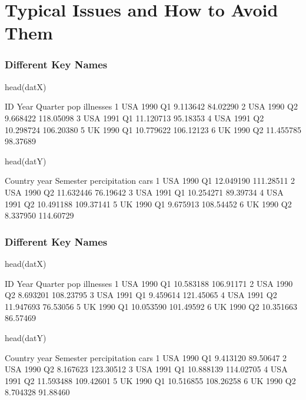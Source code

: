 \documentclass[10pt,american]{beamer}
\renewenvironment{Schunk}{}{}
\renewenvironment{Sinput}{}{}
\begin{document}
\section{Typical Issues and How to Avoid Them}
\begin{frame}
\frametitle{Different Key Names}
\begin{Schunk}
\begin{Sinput}
 head(datX)
\end{Sinput}
\begin{Soutput}
   ID Year Quarter       pop illnesses
1 USA 1990      Q1  9.113642  84.02290
2 USA 1990      Q2  9.668422 118.05098
3 USA 1991      Q1 11.120713  95.18353
4 USA 1991      Q2 10.298724 106.20380
5  UK 1990      Q1 10.779622 106.12123
6  UK 1990      Q2 11.455785  98.37689
\end{Soutput}
\begin{Sinput}
 head(datY)
\end{Sinput}
\begin{Soutput}
  Country year Semester percipitation      cars
1     USA 1990       Q1     12.049190 111.28511
2     USA 1990       Q2     11.632446  76.19642
3     USA 1991       Q1     10.254271  89.39734
4     USA 1991       Q2     10.491188 109.37141
5      UK 1990       Q1      9.675913 108.54452
6      UK 1990       Q2      8.337950 114.60729
\end{Soutput}
\end{Schunk}
\end{frame}








\begin{frame}
\frametitle{Different Key Names}
\begin{Schunk}
\begin{Sinput}
 head(datX)
\end{Sinput}
\begin{Soutput}
   ID Year Quarter       pop illnesses
1 USA 1990      Q1 10.583188 106.91171
2 USA 1990      Q2  8.693201 108.23795
3 USA 1991      Q1  9.459614 121.45065
4 USA 1991      Q2 11.947693  76.53056
5  UK 1990      Q1 10.053590 101.49592
6  UK 1990      Q2 10.351663  86.57469
\end{Soutput}
\begin{Sinput}
 head(datY)
\end{Sinput}
\begin{Soutput}
  Country year Semester percipitation      cars
1     USA 1990       Q1      9.413120  89.50647
2     USA 1990       Q2      8.167623 123.30512
3     USA 1991       Q1     10.888139 114.02705
4     USA 1991       Q2     11.593488 109.42601
5      UK 1990       Q1     10.516855 108.26258
6      UK 1990       Q2      8.704328  91.88460
\end{Soutput}
\end{Schunk}
\end{frame}
\end{document}
